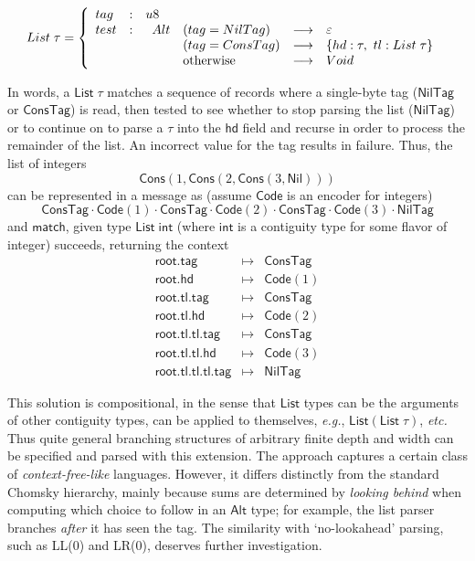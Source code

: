 \documentclass[a4paper,UKenglish,cleveref, autoref, thm-restate]{lipics-v2021}
\newcommand{\eg}{\textit{e.g.}}
\newcommand{\etc}{\textit{etc.}}
\newcommand{\konst}[1]{\ensuremath{\mathsf{#1}}}
\begin{document}
\[
 \konst{List}\;\tau =
   \left\{
     \begin{array}{lcl}
       \konst{tag} & : & \konst{u8} \\
       \konst{test} & : &
       \begin{array}[t] {lcl}
         \konst{Alt} \quad (\konst{tag} = \konst{NilTag}) & \longrightarrow & \varepsilon \\
\phantom{\konst{Alt}} \quad (\konst{tag} = \konst{ConsTag}) & \longrightarrow &
          \{ \konst{hd} : \tau, \ \konst{tl} : \konst{List}\; \tau \} \\
\phantom{\konst{Alt}} \quad \text{otherwise} & \longrightarrow & \konst{Void}
        \end{array}
     \end{array}
   \right.
\]

In words, a $\konst{List}\;\tau$ matches a sequence of records where
a single-byte tag (\konst{NilTag} or \konst{ConsTag}) is read, then tested to see
whether to stop parsing the list (\konst{NilTag}) or to continue on to
parse a $\tau$ into the \konst{hd} field and recurse in order to
process the remainder of the list. An incorrect value for the tag results in failure.
Thus, the list of integers
%
\[ \konst{Cons}(1, \konst{Cons}(2, \konst{Cons}(3, \konst{Nil}))) \]
%
can be represented in a message as (assume \konst{Code} is an encoder for integers)
%
\[ \konst{ConsTag}\cdot \konst{Code}(1) \cdot
   \konst{ConsTag}\cdot \konst{Code}(2) \cdot
   \konst{ConsTag}\cdot \konst{Code}(3) \cdot \konst{NilTag}
\]
%
and \konst{match}, given type $\konst{List}\; \konst{int}$
(where $\konst{int}$ is a contiguity type for some flavor of integer)
succeeds, returning the context
%
\[
\begin{array}{rcl}
\konst{root.tag} & \mapsto & \konst{ConsTag} \\
\konst{root.hd} & \mapsto & \konst{Code}(1) \\
\konst{root.tl.tag} & \mapsto & \konst{ConsTag} \\
\konst{root.tl.hd} & \mapsto & \konst{Code}(2) \\
\konst{root.tl.tl.tag} & \mapsto & \konst{ConsTag} \\
\konst{root.tl.tl.hd} & \mapsto & \konst{Code}(3) \\
\konst{root.tl.tl.tl.tag} & \mapsto & \konst{NilTag}
\end{array}
\]

This solution is compositional, in the sense that \konst{List} types
can be the arguments of other contiguity types, can be applied to
themselves, \eg, $\konst{List}(\konst{List}\;\tau)$, \etc \; Thus
quite general branching structures of arbitrary finite depth and width can
be specified and parsed with this extension.  The approach captures a
certain class of \emph{context-free-like} languages. However, it
differs distinctly from the standard Chomsky hierarchy, mainly because
sums are determined by \emph{looking behind} when computing which
choice to follow in an \konst{Alt} type; for example, the list parser
branches \emph{after} it has seen the tag. The similarity with
`no-lookahead' parsing, such as LL(0) and LR(0), deserves further
investigation.
\end{document}
